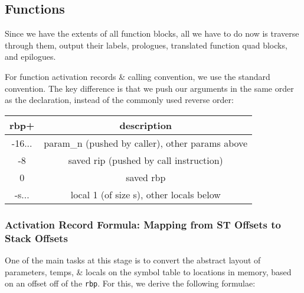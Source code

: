 \documentclass{article}
\begin{document}
\subsection{Functions}{
	Since we have the extents of all function blocks, all we have to do now is traverse through them, output their labels, prologues, translated function quad blocks, and epilogues.\bigskip
	
	For function activation records \& calling convention, we use the standard convention. The key difference is that we push our arguments in the same order as the declaration, instead of the commonly used reverse order:
	\begin{center}
		\begin{tabular}{c|c}
			\textbf{rbp+} & \textbf{description}\\
			\hline
			-16... & param\_n (pushed by caller), other params above\\
			-8 & saved rip (pushed by call instruction)\\
			0 & saved rbp\\
			-s... & local 1 (of size s), other locals below
		\end{tabular}
	\end{center}
	\subsubsection{Activation Record Formula: Mapping from ST Offsets to Stack Offsets}{
		One of the main tasks at this stage is to convert the abstract layout of parameters, temps, \& locals on the symbol table to locations in memory, based on an offset off of the \verb|rbp|. For this, we derive the following formulae:

}}
\end{document}
